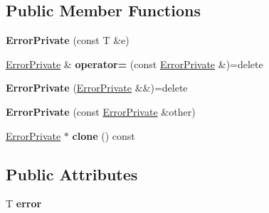 \subsection*{Public Member Functions}
\begin{DoxyCompactItemize}
\item 
{\bfseries Error\+Private} (const T \&e)\hypertarget{struct_mdt_1_1_error_private_ad9384a0be59f7227352f6b89cd9dadaf}{}\label{struct_mdt_1_1_error_private_ad9384a0be59f7227352f6b89cd9dadaf}

\item 
\hyperlink{struct_mdt_1_1_error_private}{Error\+Private} \& {\bfseries operator=} (const \hyperlink{struct_mdt_1_1_error_private}{Error\+Private} \&)=delete\hypertarget{struct_mdt_1_1_error_private_afacd6a755038d938c5090bbc515aed50}{}\label{struct_mdt_1_1_error_private_afacd6a755038d938c5090bbc515aed50}

\item 
{\bfseries Error\+Private} (\hyperlink{struct_mdt_1_1_error_private}{Error\+Private} \&\&)=delete\hypertarget{struct_mdt_1_1_error_private_aa1a90cbab26f5b7f735274815020879d}{}\label{struct_mdt_1_1_error_private_aa1a90cbab26f5b7f735274815020879d}

\item 
{\bfseries Error\+Private} (const \hyperlink{struct_mdt_1_1_error_private}{Error\+Private} \&other)\hypertarget{struct_mdt_1_1_error_private_a390b87defbbd3bfbcc774dfdbbbdb57d}{}\label{struct_mdt_1_1_error_private_a390b87defbbd3bfbcc774dfdbbbdb57d}

\item 
\hyperlink{struct_mdt_1_1_error_private}{Error\+Private} $\ast$ {\bfseries clone} () const \hypertarget{struct_mdt_1_1_error_private_af7ed703a519fc2216216daaa6dcafb70}{}\label{struct_mdt_1_1_error_private_af7ed703a519fc2216216daaa6dcafb70}

\end{DoxyCompactItemize}
\subsection*{Public Attributes}
\begin{DoxyCompactItemize}
\item 
T {\bfseries error}\hypertarget{struct_mdt_1_1_error_private_a32f76e2ab85a62fe475d39a3276abf3b}{}\label{struct_mdt_1_1_error_private_a32f76e2ab85a62fe475d39a3276abf3b}

\end{DoxyCompactItemize}


